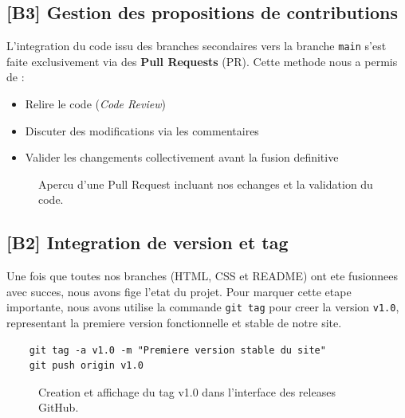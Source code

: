 \documentclass[12pt,a4paper]{article}
\begin{document}
\subsection*{[B3] Gestion des propositions de contributions}

L'integration du code issu des branches secondaires vers la branche \texttt{main} s'est faite exclusivement via des \textbf{Pull Requests} (PR). Cette methode nous a permis de :

\begin{itemize}[leftmargin=2cm]
    \item Relire le code (\textit{Code Review})
    \item Discuter des modifications via les commentaires
    \item Valider les changements collectivement avant la fusion definitive
\end{itemize}

\begin{figure}[h]
    \centering
    \caption{Apercu d'une Pull Request incluant nos echanges et la validation du code.}
\end{figure}

\newpage

\subsection*{[B2] Integration de version et tag}

Une fois que toutes nos branches (HTML, CSS et README) ont ete fusionnees avec succes, nous avons fige l'etat du projet. Pour marquer cette etape importante, nous avons utilise la commande \texttt{git tag} pour creer la version \texttt{v1.0}, representant la premiere version fonctionnelle et stable de notre site.

\begin{verbatim}
    git tag -a v1.0 -m "Premiere version stable du site"
    git push origin v1.0
\end{verbatim}

\begin{figure}[h]
    \centering
    \caption{Creation et affichage du tag v1.0 dans l'interface des releases GitHub.}
\end{figure}

\newpage

\end{document}
